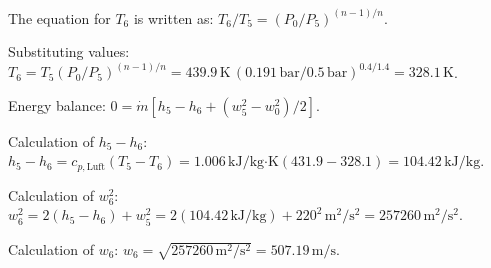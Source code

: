 The equation for \( T_6 \) is written as:  
\( T_6 / T_5 = (P_0 / P_5)^{(n-1)/n} \).  

Substituting values:  
\( T_6 = T_5 (P_0 / P_5)^{(n-1)/n} = 439.9 \, \text{K} \, (0.191 \, \text{bar} / 0.5 \, \text{bar})^{0.4/1.4} = 328.1 \, \text{K} \).  

Energy balance:  
\( 0 = \dot{m} [h_5 - h_6 + (w_5^2 - w_0^2) / 2] \).  

Calculation of \( h_5 - h_6 \):  
\( h_5 - h_6 = c_{p,\text{Luft}} (T_5 - T_6) = 1.006 \, \text{kJ/kg·K} (431.9 - 328.1) = 104.42 \, \text{kJ/kg} \).  

Calculation of \( w_6^2 \):  
\( w_6^2 = 2 (h_5 - h_6) + w_5^2 = 2 (104.42 \, \text{kJ/kg}) + 220^2 \, \text{m}^2/\text{s}^2 = 257260 \, \text{m}^2/\text{s}^2 \).  

Calculation of \( w_6 \):  
\( w_6 = \sqrt{257260 \, \text{m}^2/\text{s}^2} = 507.19 \, \text{m/s} \).